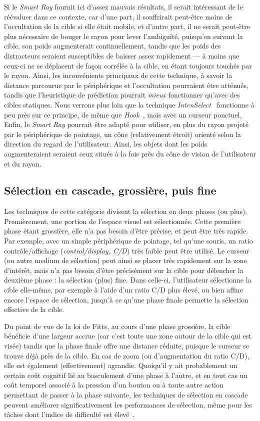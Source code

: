 	Si le \emph{Smart Ray} fournit ici d'assez mauvais résultats, il serait intéressant de le réévaluer dans ce contexte, car d'une part, il souffrirait peut-être moins de l'occultation de la cible si elle était mobile, et d'autre part, il ne serait peut-être plus nécessaire de bouger le rayon pour lever l'ambiguïté, puisqu'en suivant la cible, son poids augmenterait continuellement, tandis que les poids des distracteurs seraient susceptibles de baisser assez rapidement --- à moins que ceux-ci ne se déplacent de façon corrélée à la cible, en étant toujours touchés par le rayon. Ainsi, les inconvénients principaux de cette technique, à savoir la distance parcourue par le périphérique et l'occultation pourraient être atténués, tandis que l'heuristique de prédiction pourrait \emph{mieux} fonctionner qu'avec des cibles statiques. Nous verrons plus loin que la technique \emph{IntenSelect}~\cite{de2005intenselect} fonctionne à peu près sur ce principe, de même que \emph{Hook}~\cite{ortega2013hook}, mais avec un curseur ponctuel. Enfin, le \emph{Smart Ray} pourrait être adapté pour utiliser, en plus du rayon projeté par le périphérique de pointage, un cône (relativement étroit) orienté selon la direction du regard de l'utilisateur. Ainsi, les objets dont les poids augmenteraient seraient ceux situés à la fois près du cône de vision de l'utilisateur et du rayon.

	\subsection{Sélection en cascade, grossière, puis fine}
	\label{sub:cascade}
	Les techniques de cette catégorie divisent la sélection en deux phases (ou plus). Premièrement, une portion de l'espace visuel est sélectionnée. Cette première phase étant grossière, elle n'a pas besoin d'être précise, et peut être très rapide. Par exemple, avec un simple périphérique de pointage, tel qu'une souris, un ratio contrôle/affichage (\emph{control/display, C/D}) très faible peut être utilisé. Le curseur (ou autre medium de sélection) peut ainsi se placer très rapidement sur la zone d'intérêt, mais n'a pas besoin d'être précisément sur la cible pour délencher la deuxième phase : la sélection (plus) fine. Dans celle-ci, l'utilisateur sélectionne la cible elle-même, par exemple à l'aide d'un ratio C/D plus élevé, ou bien affine encore l'espace de sélection, jusqu'à ce qu'une phase finale permette la sélection effective de la cible.
	 
	Du point de vue de la loi de Fitts, au cours d'une phase grossière, la cible bénéficie d'une largeur accrue (car c'est toute une zone autour de la cible qui est visée) tandis que la phase finale offre une distance réduite, puisque le curseur se trouve déjà près de la cible. En cas de zoom (ou d'augmentation du ratio C/D), elle est également (effectivement) agrandie. Quoiqu'il y ait probablement un certain \og coût cognitif \fg{} lié au basculement d'une phase à l'autre, et en tout cas un coût temporel associé à la pression d'un bouton ou à toute autre action permettant de passer à la phase suivante, les techniques de sélection en cascade peuvent améliorer significativement les performances de sélection, même pour les tâches dont l'indice de difficulté est élevé~\cite{kopper2011rapid}.
	
